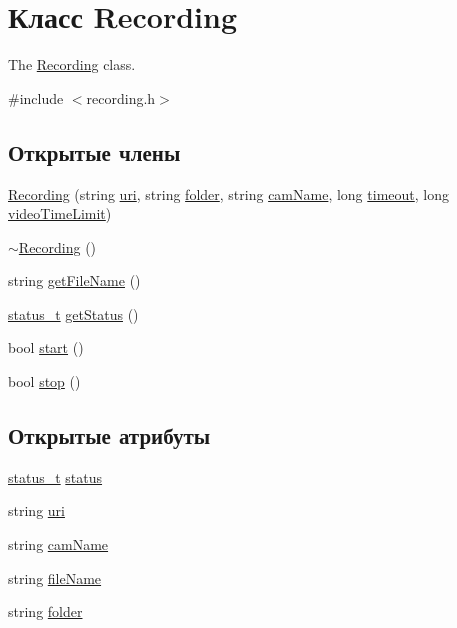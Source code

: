 \hypertarget{class_recording}{}\section{Класс Recording}
\label{class_recording}


The \hyperlink{class_recording}{Recording} class.  




{\ttfamily \#include $<$recording.\+h$>$}

\subsection*{Открытые члены}
\begin{DoxyCompactItemize}
\item 
\hyperlink{class_recording_a128dd5017ad1bece8921226043c65fd7}{Recording} (string \hyperlink{class_recording_a60be340a7e3962c15362fb03d31dbba9}{uri}, string \hyperlink{class_recording_a0c0a828e5bf501fc26db662cb00dc6f4}{folder}, string \hyperlink{class_recording_a180143a05953b93dcc80707e36f4a282}{cam\+Name}, long \hyperlink{class_recording_a395293a5505e242ace2abd0ea8269d7c}{timeout}, long \hyperlink{class_recording_a222cf4edc0c19920121639525e6975e3}{video\+Time\+Limit})
\item 
\hyperlink{class_recording_a193bfe4e47869bec27433899dbe30543}{$\sim$\+Recording} ()
\item 
string \hyperlink{class_recording_a9c1a632374ab3887670ed1e9e18a5e50}{get\+File\+Name} ()
\item 
\hyperlink{recording_8h_af9bff8ff1154a04a899276af806b8586}{status\+\_\+t} \hyperlink{class_recording_a611b49ac3f6935c312a7f3dc141d3db7}{get\+Status} ()
\item 
bool \hyperlink{class_recording_a6258253b296dfc518b4c64c8f7cb9969}{start} ()
\item 
bool \hyperlink{class_recording_a1a53044e56c8a6cf6de62a9c0a7f9ae8}{stop} ()
\end{DoxyCompactItemize}
\subsection*{Открытые атрибуты}
\begin{DoxyCompactItemize}
\item 
\hyperlink{recording_8h_af9bff8ff1154a04a899276af806b8586}{status\+\_\+t} \hyperlink{class_recording_a607280d887f940ece786b3c1092739e7}{status}
\item 
string \hyperlink{class_recording_a60be340a7e3962c15362fb03d31dbba9}{uri}
\item 
string \hyperlink{class_recording_a180143a05953b93dcc80707e36f4a282}{cam\+Name}
\item 
string \hyperlink{class_recording_a01f00d2da7a894586da88ceed7c195d6}{file\+Name}
\item 
string \hyperlink{class_recording_a0c0a828e5bf501fc26db662cb00dc6f4}{folder}
\end{DoxyCompactItemize}
